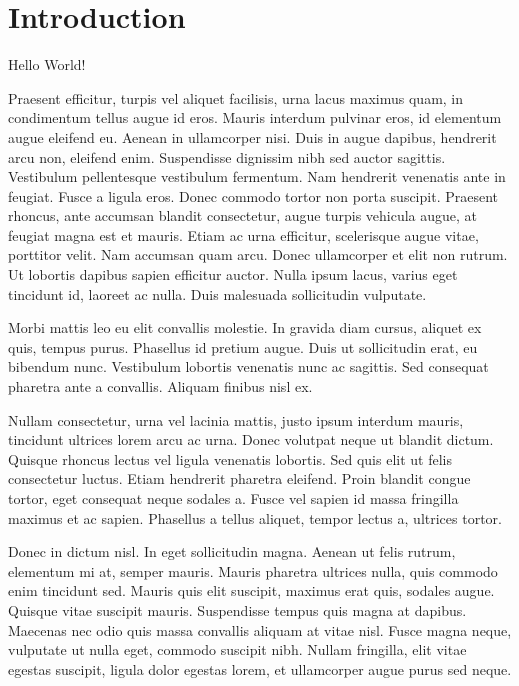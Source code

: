 \section{Introduction}
\label{sec:introcution}

Hello World!

Praesent efficitur, turpis vel aliquet facilisis, urna lacus maximus quam, in condimentum tellus augue id eros. Mauris interdum pulvinar eros, id elementum augue eleifend eu. Aenean in ullamcorper nisi. Duis in augue dapibus, hendrerit arcu non, eleifend enim. Suspendisse dignissim nibh sed auctor sagittis. Vestibulum pellentesque vestibulum fermentum. Nam hendrerit venenatis ante in feugiat. Fusce a ligula eros. Donec commodo tortor non porta suscipit. Praesent rhoncus, ante accumsan blandit consectetur, augue turpis vehicula augue, at feugiat magna est et mauris. Etiam ac urna efficitur, scelerisque augue vitae, porttitor velit. Nam accumsan quam arcu. Donec ullamcorper et elit non rutrum. Ut lobortis dapibus sapien efficitur auctor. Nulla ipsum lacus, varius eget tincidunt id, laoreet ac nulla. Duis malesuada sollicitudin vulputate.

Morbi mattis leo eu elit convallis molestie. In gravida diam cursus, aliquet ex quis, tempus purus. Phasellus id pretium augue. Duis ut sollicitudin erat, eu bibendum nunc. Vestibulum lobortis venenatis nunc ac sagittis. Sed consequat pharetra ante a convallis. Aliquam finibus nisl ex.

Nullam consectetur, urna vel lacinia mattis, justo ipsum interdum mauris, tincidunt ultrices lorem arcu ac urna. Donec volutpat neque ut blandit dictum. Quisque rhoncus lectus vel ligula venenatis lobortis. Sed quis elit ut felis consectetur luctus. Etiam hendrerit pharetra eleifend. Proin blandit congue tortor, eget consequat neque sodales a. Fusce vel sapien id massa fringilla maximus et ac sapien. Phasellus a tellus aliquet, tempor lectus a, ultrices tortor.

Donec in dictum nisl. In eget sollicitudin magna. Aenean ut felis rutrum, elementum mi at, semper mauris. Mauris pharetra ultrices nulla, quis commodo enim tincidunt sed. Mauris quis elit suscipit, maximus erat quis, sodales augue. Quisque vitae suscipit mauris. Suspendisse tempus quis magna at dapibus. Maecenas nec odio quis massa convallis aliquam at vitae nisl. Fusce magna neque, vulputate ut nulla eget, commodo suscipit nibh. Nullam fringilla, elit vitae egestas suscipit, ligula dolor egestas lorem, et ullamcorper augue purus sed neque.

